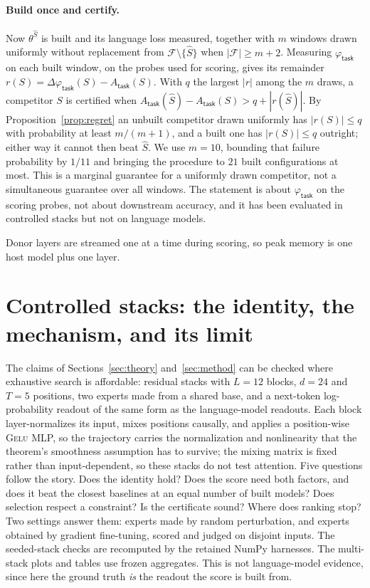 \documentclass{article}
\theoremstyle{plain}
\theoremstyle{definition}
\theoremstyle{remark}
\newcommand{\util}{\mathsf{task}}
\begin{document}
\paragraph{Build once and certify.}
Now $\theta^{\widehat{S}}$ is built and its language loss measured, together with
$m$ windows drawn uniformly without replacement from
$\mathcal{F}\setminus\{\widehat{S}\}$ when $|\mathcal{F}|\ge m+2$.
Measuring $\varphi_\util$ on each built
window, on the probes used for scoring, gives its remainder
$r(S)=\Delta\varphi_\util(S)-A_\util(S)$. With $q$ the largest $|r|$ among the
$m$ draws, a competitor $S$ is certified when
$A_\util(\widehat{S})-A_\util(S)>q+|r(\widehat{S})|$. By
Proposition~\ref{prop:regret} an unbuilt competitor drawn uniformly has
$|r(S)|\le q$ with probability at least $m/(m{+}1)$, and a built one has
$|r(S)|\le q$ outright; either way it cannot then beat $\widehat{S}$. We use
$m=10$, bounding that failure probability by $1/11$ and bringing the procedure to
$21$ built configurations at most. This is a marginal guarantee for a uniformly
drawn competitor, not a simultaneous guarantee over all windows. The statement
is about $\varphi_\util$ on the scoring probes,
not about downstream accuracy, and it has been evaluated in controlled stacks but
not on language models.

Donor layers are streamed one at a time during scoring, so peak memory is one
host model plus one layer.



\section{Controlled stacks: the identity, the mechanism, and its limit}
\label{sec:verify}

The claims of Sections~\ref{sec:theory} and~\ref{sec:method} can be checked where
exhaustive search is affordable: residual stacks with $L=12$ blocks, $d=24$ and
$T=5$ positions, two experts made from a shared base, and a next-token
log-probability readout of the same form as the language-model readouts. Each
block layer-normalizes its input, mixes positions causally, and applies a
position-wise \textsc{Gelu} MLP, so the trajectory carries the normalization and
nonlinearity that the theorem's smoothness assumption has to survive; the mixing
matrix is fixed rather than input-dependent, so these stacks do not test
attention. Five questions follow the
story. Does the identity hold? Does the score need both factors, and does it beat
the closest baselines at an equal number of built models? Does selection respect
a constraint? Is the certificate sound? Where does ranking stop? Two settings
answer them: experts made by random perturbation, and experts obtained by
gradient fine-tuning, scored and judged on disjoint inputs. The seeded-stack
checks are recomputed by the retained NumPy harnesses. The multi-stack plots
and tables use frozen aggregates.
This is not language-model evidence, since here the ground truth \emph{is} the
readout the score is built from.
\end{document}
